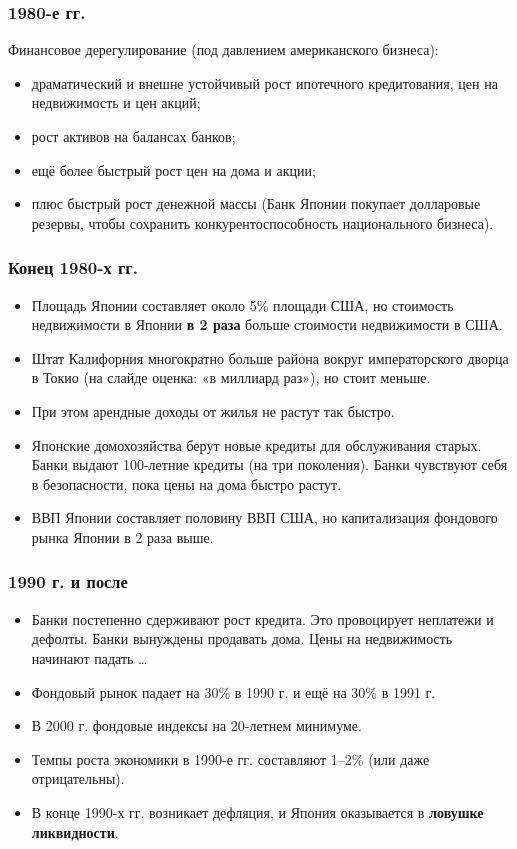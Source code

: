 \documentclass[10pt,a4paper]{article}
\begin{document}
\subsubsection{1980-е гг.}
Финансовое дерегулирование (под давлением американского бизнеса):
\begin{itemize}[leftmargin=1.3em]
\item драматический и внешне устойчивый рост ипотечного кредитования, цен на недвижимость и цен акций;
\item рост активов на балансах банков;
\item ещё более быстрый рост цен на дома и акции;
\item плюс быстрый рост денежной массы (Банк Японии покупает долларовые резервы, чтобы сохранить конкурентоспособность национального бизнеса).
\end{itemize}

\subsubsection{Конец 1980-х гг.}
\begin{itemize}[leftmargin=1.3em]
\item Площадь Японии составляет около 5\% площади США, но стоимость недвижимости в Японии \textbf{в 2 раза} больше стоимости недвижимости в США.
\item Штат Калифорния многократно больше района вокруг императорского дворца в Токио (на слайде оценка: «в миллиард раз»), но стоит меньше.
\item При этом арендные доходы от жилья не растут так быстро.
\item Японские домохозяйства берут новые кредиты для обслуживания старых. Банки выдают 100-летние кредиты (на три поколения). Банки чувствуют себя в безопасности, пока цены на дома быстро растут.
\item ВВП Японии составляет половину ВВП США, но капитализация фондового рынка Японии в 2 раза выше.
\end{itemize}

\subsubsection{1990 г. и после}
\begin{itemize}[leftmargin=1.3em]
\item Банки постепенно сдерживают рост кредита. Это провоцирует неплатежи и дефолты. Банки вынуждены продавать дома. Цены на недвижимость начинают падать \ldots
\item Фондовый рынок падает на 30\% в 1990 г. и ещё на 30\% в 1991 г.
\item В 2000 г. фондовые индексы на 20-летнем минимуме.
\item Темпы роста экономики в 1990-е гг. составляют 1--2\% (или даже отрицательны).
\item В конце 1990-х гг. возникает дефляция, и Япония оказывается в \textbf{ловушке ликвидности}.
\end{itemize}
\end{document}
